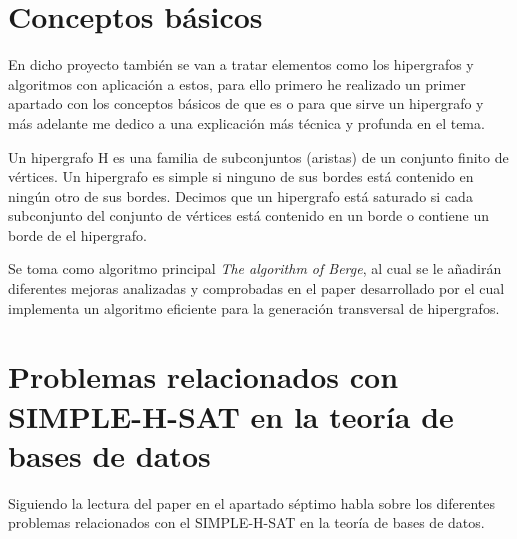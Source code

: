 \documentclass{cosas/tfg_domingo}
\begin{document}
\section{Conceptos básicos}
En dicho proyecto también se van a tratar elementos como los hipergrafos
y algoritmos con aplicación a estos, para ello primero he realizado un primer apartado con los conceptos básicos de que es o para que sirve un hipergrafo y más adelante me dedico a una explicación más técnica y profunda en el tema.

Un hipergrafo H es una familia de subconjuntos (aristas) de un conjunto finito de vértices. Un hipergrafo es simple si ninguno de sus bordes está contenido en ningún otro de sus bordes. Decimos que un hipergrafo está saturado si cada subconjunto del conjunto de vértices está contenido en un borde o contiene un borde de el hipergrafo. \citep{Thomas}

Se toma como algoritmo principal \textit{The algorithm of Berge}, al cual se le añadirán diferentes mejoras analizadas y comprobadas en el paper desarrollado por \citep{JGAA-107} el cual implementa un algoritmo eficiente para la generación transversal de hipergrafos.


%

\begin{center}








\end{center}
\newpage
\section{Problemas relacionados con SIMPLE-H-SAT en la teoría de bases de datos}

Siguiendo la lectura del paper \citep{Thomas} en el apartado séptimo habla sobre los diferentes problemas relacionados con el SIMPLE-H-SAT en la teoría de bases de datos.
\end{document}
